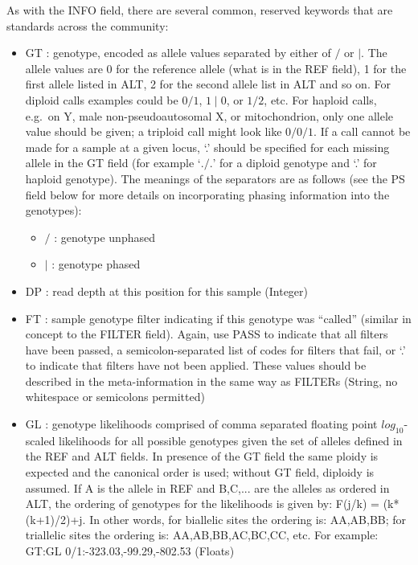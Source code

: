 \documentclass[8pt]{article}
\begin{document}
As with the INFO field, there are several common, reserved keywords that are standards across the community:

\begin{itemize}
\renewcommand{\labelitemii}{$\circ$}
  \item GT : genotype, encoded as allele values separated by either of $/$ or $\mid$. The allele values are 0 for the reference allele (what is in the REF field), 1 for the first allele listed in ALT, 2 for the second allele list in ALT and so on. For diploid calls examples could be $0/1$, $1\mid0$, or $1/2$, etc. For haploid calls, e.g.\ on Y, male non-pseudoautosomal X, or mitochondrion, only one allele value should be given; a triploid call might look like $0/0/1$. If a call cannot be made for a sample at a given locus, `.' should be specified for each missing allele in the GT field (for example `$./.$' for a diploid genotype and `.' for haploid genotype). The meanings of the separators are as follows (see the PS field below for more details on incorporating phasing information into the genotypes):
	\begin{itemize}
	  \item $/$ : genotype unphased
	  \item $\mid$ : genotype phased
	\end{itemize}
  \item DP : read depth at this position for this sample (Integer)
  \item FT : sample genotype filter indicating if this genotype was ``called'' (similar in concept to the FILTER field). Again, use PASS to indicate that all filters have been passed, a semicolon-separated list of codes for filters that fail, or `.' to indicate that filters have not been applied. These values should be described in the meta-information in the same way as FILTERs (String, no whitespace or semicolons permitted)
  \item GL : genotype likelihoods comprised of comma separated floating point $log_{10}$-scaled likelihoods for all possible genotypes given the set of alleles defined in the REF and ALT fields. In presence of the GT field the same ploidy is expected and the canonical order is used; without GT field, diploidy is assumed. If A is the allele in REF and B,C,... are the alleles as ordered in ALT, the ordering of genotypes for the likelihoods is given by: F(j/k) = (k*(k+1)/2)+j.  In other words, for biallelic sites the ordering is: AA,AB,BB; for triallelic sites the ordering is: AA,AB,BB,AC,BC,CC, etc.  For example: GT:GL 0/1:-323.03,-99.29,-802.53 (Floats)

\end{itemize}
\end{document}
